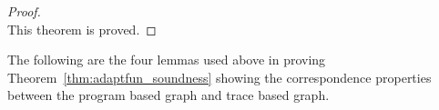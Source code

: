\begin{proof}
%
%
%
%
\\
This theorem is proved.
\end{proof}
The following are the four lemmas used above in proving Theorem~\ref{thm:adaptfun_soundness}
showing the correspondence properties between the program based graph and trace based graph.
